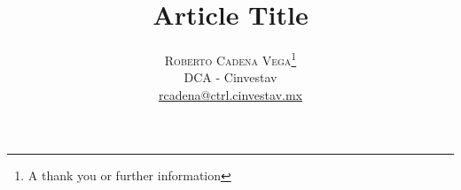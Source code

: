 \documentclass[twoside]{article}
\title{\vspace{-15mm}\fontsize{24pt}{10pt}\selectfont\textbf{Article Title}} %
\author{
\large
\textsc{Roberto Cadena Vega}\thanks{A thank you or further information}\\[2mm] %
\normalsize DCA - Cinvestav \\ %
\normalsize \href{mailto:rcadena@ctrl.cinvestav.mx}{rcadena@ctrl.cinvestav.mx} %
\vspace{-5mm}
}
\date{}
\begin{document}
    \maketitle %

    \thispagestyle{fancy} %


    \begin{abstract}

        \noindent \lipsum[1] %

    \end{abstract}

\end{document}
